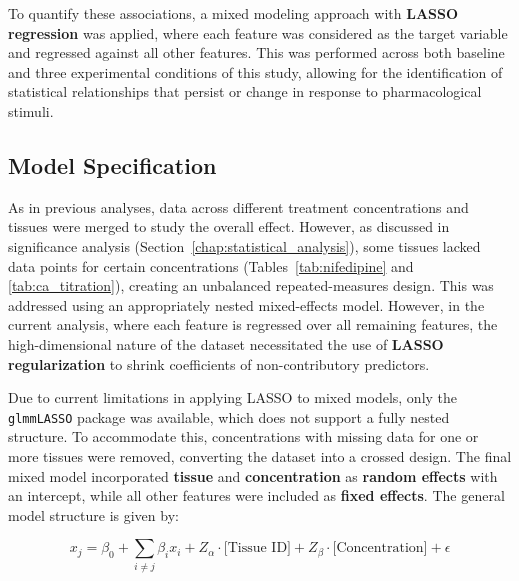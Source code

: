\documentclass{report}
\begin{document}
    To quantify these associations, a mixed modeling approach with \textbf{LASSO regression} was applied, where each feature was considered as the target variable and regressed against all other features. This was performed across both baseline and three experimental conditions of this study, allowing for the identification of statistical relationships that persist or change in response to pharmacological stimuli.

    \subsection{Model Specification}
    As in previous analyses, data across different treatment concentrations and tissues were merged to study the overall effect. However, as discussed in significance analysis (Section~\ref{chap:statistical_analysis}), some tissues lacked data points for certain concentrations (Tables~\ref{tab:nifedipine} and \ref{tab:ca_titration}), creating an unbalanced repeated-measures design. This was addressed using an appropriately nested mixed-effects model. However, in the current analysis, where each feature is regressed over all remaining features, the high-dimensional nature of the dataset necessitated the use of \textbf{LASSO regularization} to shrink coefficients of non-contributory predictors.
        
    Due to current limitations in applying LASSO to mixed models, only the \texttt{glmmLASSO} \cite{Schelldorfer03042014} package was available, which does not support a fully nested structure. To accommodate this, concentrations with missing data for one or more tissues were removed, converting the dataset into a crossed design. The final mixed model incorporated \textbf{tissue} and \textbf{concentration} as \textbf{random effects} with an intercept, while all other features were included as \textbf{fixed effects}. The general model structure is given by:
    
       \[
        x_j = \beta_0 + \sum_{i \neq j} \beta_i x_i + Z_\alpha \cdot \text{[Tissue ID]} + Z_\beta \cdot \text{[Concentration]} + \epsilon
        \]
        
\end{document}
